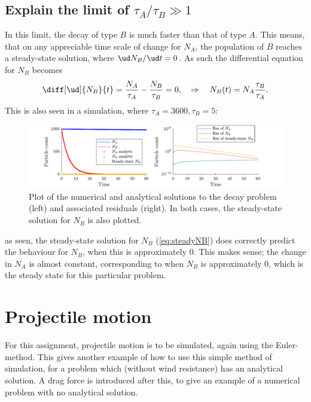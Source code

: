 \documentclass[a4paper,10pt]{article} 	%
\numberwithin{equation}{section}
\begin{document}
	\subsection{Explain the limit of $ \tau_A/\tau_B \gg 1 $}
	In this limit, the decay of type $ B $ is much faster than that of type $ A $. This means, that on any appreciable time scale of change for $ N_A $, the population of $ B $ reaches a steady-state solution, where $ \ud N_B/\ud t = 0 $. As such the differential equation for $ N_B $ becomes
	\begin{equation}\label{eq:steadyNB}
		\diff[\ud]{N_B}{t} = \frac{N_A}{\tau_A} - \frac{N_B}{\tau_B} = 0, \quad \Rightarrow \quad N_B(t) = N_A \frac{\tau_B}{\tau_A}.
	\end{equation}
	This is also seen in a simulation, where $ \tau_A = 3600,\tau_B = 5 $:
	\begin{figure}[H]
		\centering
		\includegraphics[width=\linewidth]{largetau.pdf}
		\caption{Plot of the numerical and analytical solutions to the decay problem (left) and associated residuals (right). In both cases, the steady-state solution for $ N_B $ is also plotted.}
		\label{fig:largeTau}
	\end{figure}
	as seen, the steady-state solution for $ N_B $ (\eqref{eq:steadyNB}) does correctly predict the behaviour for $ N_B $, when this is approximately 0. This makes sense; the change in $ N_A $ is almost constant, corresponding to when $ N_B $ is approximately 0, which is the steady state for this particular problem.
	
	
	\section{Projectile motion}
	For this assignment, projectile motion is to be simulated, again using the Euler-method. This gives another example of how to use this simple method of simulation, for a problem which (without wind resistance) has an analytical solution. A drag force is introduced after this, to give an example of a numerical problem with no analytical solution.
	
	
\end{document}
